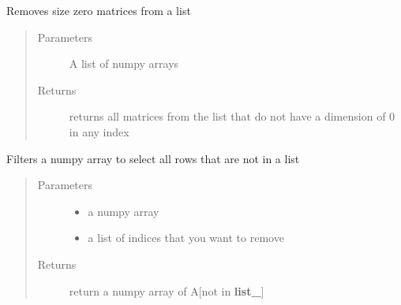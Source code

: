 \documentclass[letterpaper,10pt,english]{sphinxmanual}
\begin{document}
\begin{fulllineitems}
\label{\detokenize{mpo.utils:mpo.utils.general_utils.remove_size_zero_matrices}}
\sphinxAtStartPar
Removes size zero matrices from a list
\begin{quote}\begin{description}
\item[{Parameters}] \leavevmode
\sphinxAtStartPar
{} \textendash{} A list of numpy arrays

\item[{Returns}] \leavevmode
\sphinxAtStartPar
returns all matrices from the list that do not have a dimension of 0 in any index

\end{description}\end{quote}

\end{fulllineitems}


\begin{fulllineitems}
\label{\detokenize{mpo.utils:mpo.utils.general_utils.select_not_in_list}}
\sphinxAtStartPar
Filters a numpy array to select all rows that are not in a list
\begin{quote}\begin{description}
\item[{Parameters}] \leavevmode\begin{itemize}
\item {} 
\sphinxAtStartPar
{} \textendash{} a numpy array

\item {} 
\sphinxAtStartPar
{} \textendash{} a list of indices that you want to remove

\end{itemize}

\item[{Returns}] \leavevmode
\sphinxAtStartPar
return a numpy array of A{[}not in {\color{red}\bfseries{}list\_}{]}

\end{description}\end{quote}

\end{fulllineitems}
\end{document}
